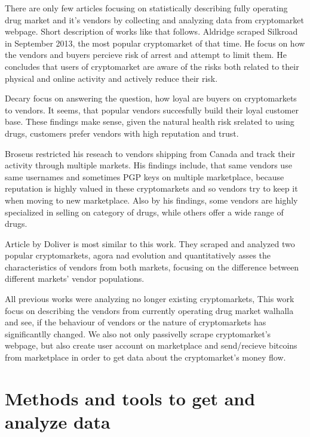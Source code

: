 \documentclass[
  digital, %
  table,   %
  lof,     %
  lot,     %
  oneside
]{fithesis3}
\begin{document}
There are only few articles focusing on statistically describing fully operating drug market and it's vendors
by collecting and analyzing data from cryptomarket webpage. Short description of works like that follows.
Aldridge \parencite{aldridge2017delivery} scraped Silkroad in September 2013, the most popular cryptomarket of that time.
He focus on how the vendors and buyers percieve risk of arrest and attempt to limit them.
He concludes that users of cryptomarket are aware of the risks both related to their physical and online activity
and actively reduce their risk.

Decary \parencite{decary2017repeat} focus on answering the question, how loyal are buyers 
on cryptomarkets to vendors. It seems, that popular vendors succesfully build their loyal
customer base. These findings make sense, given the natural health risk srelated to using drugs,
customers prefer vendors with high reputation and trust.

Broseus \parencite{broseus2016studying} restricted his reseach to vendors shipping from Canada
and track their activity through multiple markets. His findings include, that same vendors
use same usernames and sometimes PGP keys on multiple marketplace, because reputation
is highly valued in these cryptomarkets and so vendors try to keep it when moving to new marketplace.
Also by his findings, some vendors are highly specialized in selling on category of drugs, while others offer a wide range of drugs.

Article by Doliver \parencite{dolliver2016characteristics} is most similar to this work.
They scraped and analyzed two popular cryptomarkets, agora nad evolution and quantitatively asses
the characteristics of vendors from both markets, focusing on the difference
 between different markets' vendor populations.

 All previous works were analyzing no longer existing cryptomarkets,
 This work focus on describing the vendors from currently operating drug market walhalla 
 and see, if the behaviour of vendors or the nature of cryptomarkets
 has significantlly changed. We also not only passivelly scrape cryptomarket's webpage,
 but also create user account on marketplace and send/recieve bitcoins from marketplace
 in order to get data about the cryptomarket's money flow.
 

\chapter{Methods and tools to get and analyze data}
\end{document}
